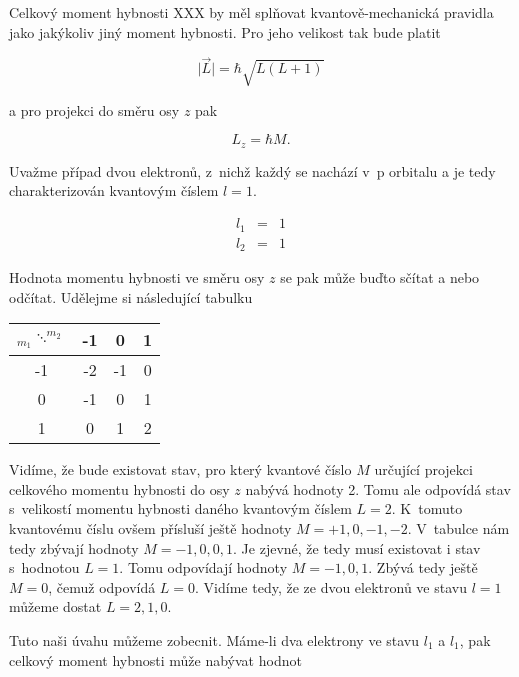 Celkový moment hybnosti XXX by měl splňovat kvantově-mechanická pravidla jako jakýkoliv jiný moment hybnosti. Pro jeho velikost tak bude platit

\begin{equation}
\vert \vec{L} \vert = \hbar \sqrt{L(L+1)}
\label{rov:VE-63}
\end{equation}

\noindent a pro projekci do směru osy $z$ pak

\begin{equation}
L_z = \hbar M.
\label{rov:VE-64}
\end{equation}
 

Uvažme případ dvou elektronů, z~nichž každý se nachází v~p orbitalu a je tedy charakterizován kvantovým číslem $l=1$.

\begin{eqnarray*}
l_1 &=& 1 \\
l_2 &=& 1
\end{eqnarray*}

\noindent Hodnota momentu hybnosti ve směru osy $z$ se pak může buďto sčítat a nebo odčítat. Udělejme si následující tabulku

\begin{table}[ht]
\centering
\begin{tabular}{c|ccc}
\toprule
    $_{m_1}\ddots^{m_2}$      & -1    & 0     & 1 \\
\midrule
    -1    & -2    & -1    & 0 \\
    0     & -1    & 0     & 1 \\
    1     & 0     & 1     & 2 \\
\bottomrule
\end{tabular}
\label{tab:ScitaniHybnosti}
\end{table}



Vidíme, že bude existovat stav, pro který kvantové číslo $M$ určující projekci celkového momentu hybnosti do osy $z$ nabývá hodnoty 2. Tomu ale odpovídá stav s~velikostí momentu hybnosti daného kvantovým číslem $L = 2$. K~tomuto kvantovému číslu ovšem přísluší ještě hodnoty $M=+1,0,-1,-2$. V~tabulce nám tedy zbývají hodnoty $M =-1,0,0,1$. Je zjevné, že tedy musí existovat i stav s~hodnotou $L=1$. Tomu odpovídají hodnoty $M=-1,0, 1$. Zbývá tedy ještě $M=0$, čemuž odpovídá $L=0$. Vidíme tedy, že ze dvou elektronů ve stavu $l=1$ můžeme dostat $L=2,1,0$. 

Tuto naši úvahu můžeme zobecnit. Máme-li dva elektrony ve stavu $l_1$ a $l_1$, pak celkový moment hybnosti může nabývat hodnot

